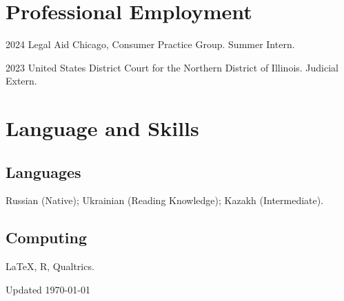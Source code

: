 \documentclass[11pt,letterpaper]{report}
\begin{document}
 

    \section*{Professional Employment}

    \begin{tablist}

        \item[2024] \tab{}Legal Aid Chicago, Consumer Practice Group. Summer Intern.
        \item[2023] \tab{}United States District Court for the Northern District of Illinois. Judicial Extern.
 

    \end{tablist}


    \section*{Language and Skills}

    \subsection*{Languages}
        Russian (Native); Ukrainian (Reading Knowledge); Kazakh (Intermediate).
    \subsection*{Computing}
        \LaTeX, R, Qualtrics.
    
    \begin{center}
        \vfill
        Updated \monthyeardate\today
    \end{center}
\end{document}
